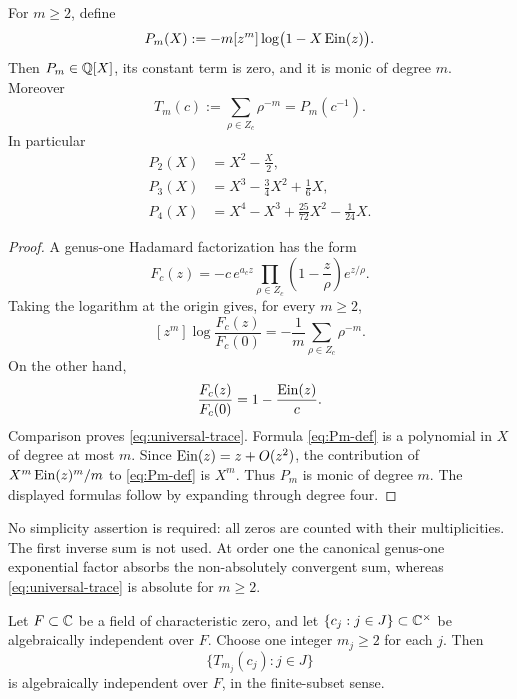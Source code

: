\begin{theorem}
\label{thm:universal-trace}
For \(m\ge2\), define
\begin{equation}\label{eq:Pm-def}
 P_m(X):=-m[z^m]\log\bigl(1-X\operatorname{Ein}(z)\bigr).
\end{equation}
Then \(P_m\in\mathbb Q[X]\), its constant term is zero, and it is monic of degree
\(m\).  Moreover
\begin{equation}\label{eq:universal-trace}
 \boxed{\displaystyle
 T_m(c):=\sum_{\rho\in Z_c}\rho^{-m}=P_m(c^{-1}).}
\end{equation}
In particular
\begin{align}
 P_2(X)&=X^2-\frac X2,\label{eq:P2}\\
 P_3(X)&=X^3-\frac34X^2+\frac16X,\label{eq:P3}\\
 P_4(X)&=X^4-X^3+\frac{25}{72}X^2-\frac1{24}X.\label{eq:P4}
\end{align}
\end{theorem}

\begin{proof}
A genus-one Hadamard factorization has the form
\[
 F_c(z)=-c\,e^{a_cz}
 \prod_{\rho\in Z_c}
 \left(1-\frac z\rho\right)e^{z/\rho}.
\]
Taking the logarithm at the origin gives, for every \(m\ge2\),
\[
 [z^m]\log\frac{F_c(z)}{F_c(0)}
 =-\frac1m\sum_{\rho\in Z_c}\rho^{-m}.
\]
On the other hand,
\[
 \frac{F_c(z)}{F_c(0)}=1-\frac{\operatorname{Ein}(z)}c.
\]
Comparison proves \eqref{eq:universal-trace}.  Formula
\eqref{eq:Pm-def} is a polynomial in \(X\) of degree at most \(m\).  Since
\(\operatorname{Ein}(z)=z+O(z^2)\), the contribution of
\(X^m\operatorname{Ein}(z)^m/m\) to \eqref{eq:Pm-def} is \(X^m\).  Thus \(P_m\) is monic
of degree \(m\).  The displayed formulas follow by expanding through degree
four.
\end{proof}

\begin{remark}
No simplicity assertion is required: all zeros are counted with their
multiplicities.  The first inverse sum is not used.  At order one the
canonical genus-one exponential factor absorbs the non-absolutely convergent
sum, whereas \eqref{eq:universal-trace} is absolute for \(m\ge2\).
\end{remark}

\begin{corollary}
\label{cor:transversal}
Let \(F\subset\mathbb C\) be a field of characteristic zero, and let
\(\{c_j:j\in J\}\subset\mathbb C^\times\) be algebraically independent over \(F\).
Choose one integer \(m_j\ge2\) for each \(j\).  Then
\[
 \{T_{m_j}(c_j):j\in J\}
\]
is algebraically independent over \(F\), in the finite-subset sense.
\end{corollary}

